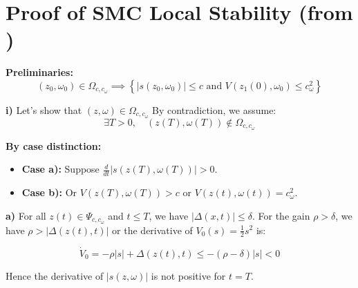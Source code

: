 
\chapter{Proof of SMC Local Stability (from \cite{tietze2025dynamic})}
\label{app:ProofSMCLocalStabNiclas}


\textbf{Preliminaries:}
\begin{equation}
(z_0, \omega_0) \in \Omega_{c, c_\omega} \implies \left\{ |s(z_0, \omega_0)| \leq c \text{ and } V(z_1(0), \omega_0) \leq c_\omega^2 \right\}
\end{equation}

\textbf{i)} Let's show that \((z, \omega) \in \Omega_{c, c_\omega}\)
By contradiction, we assume:
\begin{equation}
\exists T > 0, \quad (z(T), \omega(T)) \notin \Omega_{c, c_\omega}
\end{equation}

\textbf{By case distinction:}
\begin{itemize}
    \item \textbf{Case a):} Suppose \( \frac{d}{dt} |s(z(T), \omega(T))| > 0 \).
    \item \textbf{Case b):} Or \( V(z(T), \omega(T)) > c \) or \( V(z(t), \omega(t)) = c_\omega^2 \).
\end{itemize}


\textbf{a)} For all \( z(t) \in \Psi_{c, c_\omega} \) and \( t \leq T \), we have
 \( |\Delta(x, t)| \leq \delta \). For the gain \( \rho > \delta \), we have 
 \( \rho > |\Delta(z(t), t)| \) or the derivative of \( V_0(s) = \frac{1}{2} s^2 \) is:

\begin{equation}
\dot{V}_0 = - \rho |s| + \Delta(z(t), t) \leq -(\rho - \delta)|s| < 0
\end{equation}

Hence the derivative of \( |s(z, \omega)| \) is not positive for \( t = T \).


